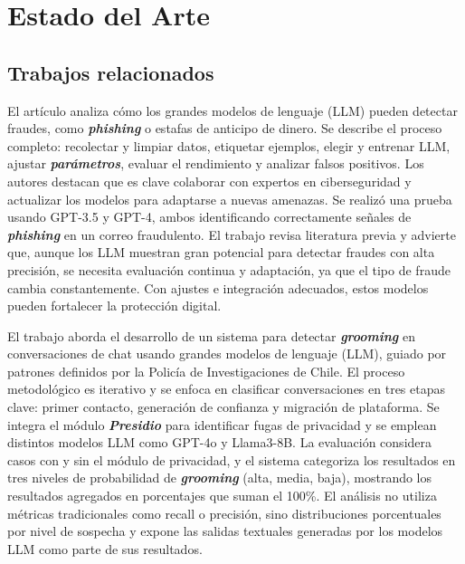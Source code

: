 \chapter{Estado del Arte}

\section{Trabajos relacionados}

El artículo analiza cómo los grandes modelos de lenguaje (LLM) pueden detectar fraudes, como \textbf{\textit{phishing}} o estafas de anticipo de dinero. Se describe el proceso completo: recolectar y limpiar datos, etiquetar ejemplos, elegir y entrenar LLM, ajustar \textbf{\textit{parámetros}}, evaluar el rendimiento y analizar falsos positivos. Los autores destacan que es clave colaborar con expertos en ciberseguridad y actualizar los modelos para adaptarse a nuevas amenazas. Se realizó una prueba usando GPT-3.5 y GPT-4, ambos identificando correctamente señales de \textbf{\textit{phishing}} en un correo fraudulento. El trabajo revisa literatura previa y advierte que, aunque los LLM muestran gran potencial para detectar fraudes con alta precisión, se necesita evaluación continua y adaptación, ya que el tipo de fraude cambia constantemente. Con ajustes e integración adecuados, estos modelos pueden fortalecer la protección digital.

\cite{jiang2024detectingscamsusinglarge}

El trabajo aborda el desarrollo de un sistema para detectar \textbf{\textit{grooming}} en conversaciones de chat usando grandes modelos de lenguaje (LLM), guiado por patrones definidos por la Policía de Investigaciones de Chile. El proceso metodológico es iterativo y se enfoca en clasificar conversaciones en tres etapas clave: primer contacto, generación de confianza y migración de plataforma. Se integra el módulo \textbf{\textit{Presidio}} para identificar fugas de privacidad y se emplean distintos modelos LLM como GPT-4o y Llama3-8B. La evaluación considera casos con y sin el módulo de privacidad, y el sistema categoriza los resultados en tres niveles de probabilidad de \textbf{\textit{grooming}} (alta, media, baja), mostrando los resultados agregados en porcentajes que suman el 100\%. El análisis no utiliza métricas tradicionales como recall o precisión, sino distribuciones porcentuales por nivel de sospecha y expone las salidas textuales generadas por los modelos LLM como parte de sus resultados.

\cite{UdeCRepository}

